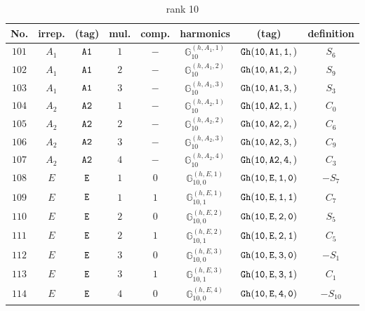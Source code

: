 \documentclass[fleqn,8pt]{jsarticle}
\begin{document}
\begin{table}[ht!]
\begin{center}
\caption{rank 10}
\renewcommand{\arraystretch}{1.3}
\begin{tabular}{cccccccc} \hline \hline
No. & irrep. & (tag) & mul. & comp. & harmonics & (tag) & definition \\ \hline
$ 101 $ & $ A_{1} $ & $ {\tt A1} $ & $ 1 $ & $ - $ & $ \mathbb{G}_{10}^{(h,A_{1},1)} $ & $ {\tt Gh(10,A1,1,)} $ & $ S_{6} $ \\
$ 102 $ & $ A_{1} $ & $ {\tt A1} $ & $ 2 $ & $ - $ & $ \mathbb{G}_{10}^{(h,A_{1},2)} $ & $ {\tt Gh(10,A1,2,)} $ & $ S_{9} $ \\
$ 103 $ & $ A_{1} $ & $ {\tt A1} $ & $ 3 $ & $ - $ & $ \mathbb{G}_{10}^{(h,A_{1},3)} $ & $ {\tt Gh(10,A1,3,)} $ & $ S_{3} $ \\
$ 104 $ & $ A_{2} $ & $ {\tt A2} $ & $ 1 $ & $ - $ & $ \mathbb{G}_{10}^{(h,A_{2},1)} $ & $ {\tt Gh(10,A2,1,)} $ & $ C_{0} $ \\
$ 105 $ & $ A_{2} $ & $ {\tt A2} $ & $ 2 $ & $ - $ & $ \mathbb{G}_{10}^{(h,A_{2},2)} $ & $ {\tt Gh(10,A2,2,)} $ & $ C_{6} $ \\
$ 106 $ & $ A_{2} $ & $ {\tt A2} $ & $ 3 $ & $ - $ & $ \mathbb{G}_{10}^{(h,A_{2},3)} $ & $ {\tt Gh(10,A2,3,)} $ & $ C_{9} $ \\
$ 107 $ & $ A_{2} $ & $ {\tt A2} $ & $ 4 $ & $ - $ & $ \mathbb{G}_{10}^{(h,A_{2},4)} $ & $ {\tt Gh(10,A2,4,)} $ & $ C_{3} $ \\
$ 108 $ & $ E $ & $ {\tt E} $ & $ 1 $ & $ 0 $ & $ \mathbb{G}_{10,0}^{(h,E,1)} $ & $ {\tt Gh(10,E,1,0)} $ & $ - S_{7} $ \\
$ 109 $ & $ E $ & $ {\tt E} $ & $ 1 $ & $ 1 $ & $ \mathbb{G}_{10,1}^{(h,E,1)} $ & $ {\tt Gh(10,E,1,1)} $ & $ C_{7} $ \\
$ 110 $ & $ E $ & $ {\tt E} $ & $ 2 $ & $ 0 $ & $ \mathbb{G}_{10,0}^{(h,E,2)} $ & $ {\tt Gh(10,E,2,0)} $ & $ S_{5} $ \\
$ 111 $ & $ E $ & $ {\tt E} $ & $ 2 $ & $ 1 $ & $ \mathbb{G}_{10,1}^{(h,E,2)} $ & $ {\tt Gh(10,E,2,1)} $ & $ C_{5} $ \\
$ 112 $ & $ E $ & $ {\tt E} $ & $ 3 $ & $ 0 $ & $ \mathbb{G}_{10,0}^{(h,E,3)} $ & $ {\tt Gh(10,E,3,0)} $ & $ - S_{1} $ \\
$ 113 $ & $ E $ & $ {\tt E} $ & $ 3 $ & $ 1 $ & $ \mathbb{G}_{10,1}^{(h,E,3)} $ & $ {\tt Gh(10,E,3,1)} $ & $ C_{1} $ \\
$ 114 $ & $ E $ & $ {\tt E} $ & $ 4 $ & $ 0 $ & $ \mathbb{G}_{10,0}^{(h,E,4)} $ & $ {\tt Gh(10,E,4,0)} $ & $ - S_{10} $ \\

\end{tabular}
\end{center}
\end{table}
\end{document}
